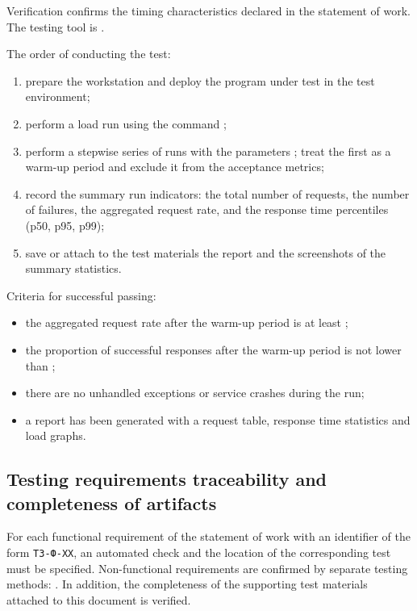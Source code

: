 \documentclass[12pt,a4paper]{extarticle}
\begin{document}
\begin{hseExample}
Verification confirms the timing characteristics declared in the statement of work. The testing tool is .

The order of conducting the test:
\begin{enumerate}[label=\arabic*), leftmargin=1.25cm]
    \item prepare the workstation and deploy the program under test in the test environment;
    \item perform a load run using the command ;
    \item perform a stepwise series of runs with the parameters ; treat the first  as a warm-up period and exclude it from the acceptance metrics;
    \item record the summary run indicators: the total number of requests, the number of failures, the aggregated request rate, and the response time percentiles (p50, p95, p99);
    \item save or attach to the test materials the report and the screenshots of the summary statistics.
\end{enumerate}

Criteria for successful passing:
\begin{itemize}[nosep, leftmargin=1.25cm]
    \item the aggregated request rate after the warm-up period is at least ;
    \item the proportion of successful responses after the warm-up period is not lower than ;
    \item there are no unhandled exceptions or service crashes during the run;
    \item a report has been generated with a request table, response time statistics and load graphs.
\end{itemize}
\end{hseExample}

\subsection{Testing requirements traceability and completeness of artifacts}

\begin{hseExample}
For each functional requirement of the statement of work with an identifier of the form \texttt{ТЗ-Ф-XX}, an automated check and the location of the corresponding test must be specified. Non-functional requirements are confirmed by separate testing methods: . In addition, the completeness of the supporting test materials attached to this document is verified.
\end{hseExample}
\end{document}
